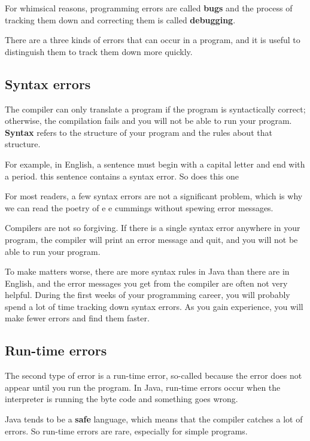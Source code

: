 \documentclass[12pt]{book}
\theoremstyle{definition}
\begin{document}
For whimsical reasons,
programming errors are called {\bf bugs} and the process
of tracking them down and correcting them is called
{\bf debugging}.

There are a three kinds of errors that can occur
in a program, and it is useful to distinguish them
to track them down more quickly.

\subsection{Syntax errors}

The compiler can only translate a program if the program is
syntactically correct; otherwise, the compilation fails and
you will not be able to run your program.  {\bf Syntax}
refers to the structure of your program and the rules about
that structure.

For example, in English, a sentence must begin with a capital
letter and end with a period.  this sentence contains a syntax
error.  So does this one

For most readers, a few syntax errors are not a significant
problem, which is why we can read the poetry of e e cummings
without spewing error messages.

Compilers are not so forgiving.  If there is a single syntax
error anywhere in your program, the compiler will print an
error message and quit, and you will not be able to run
your program.

To make matters worse, there are more syntax rules in Java
than there are in English, and the error messages you get from
the compiler are often not very helpful.  During the first
weeks of your programming career, you will probably
spend a lot of time tracking down syntax errors.  As you
gain experience, you will make fewer errors and find
them faster.

\subsection{Run-time errors}
\label{run-time}

The second type of error is a run-time error, so-called because
the error does not appear until you run the program.  In Java,
run-time errors occur when the interpreter is running the byte
code and something goes wrong.

Java tends to be a {\bf safe}
language, which means that the compiler catches a lot of errors.
So run-time errors are rare, especially
for simple programs.
\end{document}
